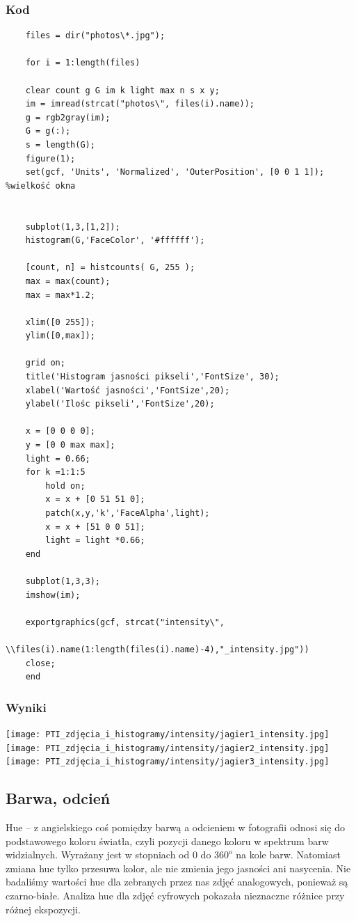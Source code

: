 \documentclass[options]{mwart}
\begin{document}
\subsubsection{Kod}
\begin{verbatim}
    files = dir("photos\*.jpg");
    
    for i = 1:length(files)
    
    clear count g G im k light max n s x y;
    im = imread(strcat("photos\", files(i).name));
    g = rgb2gray(im);
    G = g(:);
    s = length(G);
    figure(1);
    set(gcf, 'Units', 'Normalized', 'OuterPosition', [0 0 1 1]); %wielkość okna
    
    
    subplot(1,3,[1,2]); 
    histogram(G,'FaceColor', '#ffffff');
    
    [count, n] = histcounts( G, 255 );
    max = max(count);
    max = max*1.2;
    
    xlim([0 255]);
    ylim([0,max]);
    
    grid on;
    title('Histogram jasności pikseli','FontSize', 30);
    xlabel('Wartość jasności','FontSize',20);
    ylabel('Ilośc pikseli','FontSize',20);
    
    x = [0 0 0 0];
    y = [0 0 max max];
    light = 0.66;
    for k =1:1:5
        hold on;
        x = x + [0 51 51 0];
        patch(x,y,'k','FaceAlpha',light);
        x = x + [51 0 0 51];
        light = light *0.66;
    end
    
    subplot(1,3,3);
    imshow(im);
    
    exportgraphics(gcf, strcat("intensity\", 
                        \\files(i).name(1:length(files(i).name)-4),"_intensity.jpg"))
    close;
    end
    \end{verbatim}


\subsubsection{Wyniki}

\texttt{[image: PTI\_zdjęcia\_i\_histogramy/intensity/jagier1\_intensity.jpg]}
\texttt{[image: PTI\_zdjęcia\_i\_histogramy/intensity/jagier2\_intensity.jpg]}
\texttt{[image: PTI\_zdjęcia\_i\_histogramy/intensity/jagier3\_intensity.jpg]}



\newpage
\subsection{Barwa, odcień}
Hue -- z angielskiego coś pomiędzy barwą a odcieniem w fotografii odnosi się
do podstawowego koloru światła, czyli pozycji danego koloru w spektrum barw
widzialnych. Wyrażany jest w stopniach od $0$ do $360^o$ na kole
barw. Natomiast zmiana hue tylko przesuwa kolor, ale nie zmienia jego jasności
ani nasycenia. Nie badaliśmy wartości hue dla zebranych przez nas zdjęć analogowych,
ponieważ są czarno-białe. Analiza hue dla zdjęć cyfrowych pokazała nieznaczne różnice przy różnej ekspozycji.
\end{document}
